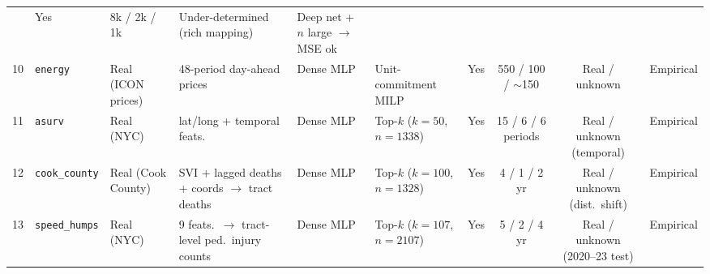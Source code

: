 \begin{table}
\begin{adjustbox}{max width=\linewidth}
\begin{tabular}{@{}cllllllccl@{}}
           & Yes
           & 8k / 2k / 1k
           & Under-determined (rich mapping)
           & Deep net + $n$ large $\to$ MSE ok \\
        10 & \texttt{energy}
           & Real (ICON prices)
           & 48-period day-ahead prices
           & Dense MLP
           & Unit-commitment MILP
           & Yes
           & 550 / 100 / $\sim$150
           & Real / unknown
           & Empirical \\
        11 & \texttt{asurv}
           & Real (NYC)
           & lat/long + temporal feats.
           & Dense MLP
           & Top-$k$ ($k{=}50$, $n{=}1338$)
           & Yes
           & 15 / 6 / 6 periods
           & Real / unknown (temporal)
           & Empirical \\
        12 & \texttt{cook\_county}
           & Real (Cook County)
           & \makecell[l]{SVI + lagged deaths +\\ coords $\to$ tract deaths}
           & Dense MLP
           & Top-$k$ ($k{=}100$, $n{=}1328$)
           & Yes
           & 4 / 1 / 2 yr
           & \makecell[l]{Real / unknown\\ (dist.\ shift)}
           & Empirical \\
        13 & \texttt{speed\_humps}
           & Real (NYC)
           & \makecell[l]{9 feats.\ $\to$ tract-level\\ ped.\ injury counts}
           & Dense MLP
           & Top-$k$ ($k{=}107$, $n{=}2107$)
           & Yes
           & 5 / 2 / 4 yr
           & \makecell[l]{Real / unknown\\ (2020--23 test)}
           & Empirical \\
        \bottomrule
    \end{tabular}
    \end{adjustbox}


\end{table}
